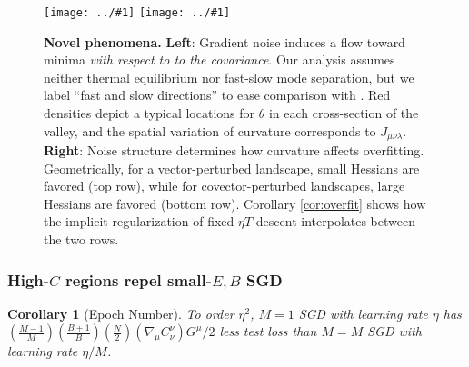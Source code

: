 \documentclass{article}
\theoremstyle{plain}
\newtheorem{cor}{Corollary}
\theoremstyle{definition}
\newcommand{\wrap}[1]{\left(#1\right)}
\newcommand{\plotmooh}[3]{\texttt{[image: ../\#1]}}
\begin{document}
            \begin{figure}[h!]
                \centering
                \plotmooh{diagrams/entropic-force-diagram}{}{0.32\columnwidth} 
                \plotmooh{diagrams/sharp}{}{0.31\columnwidth}
                \caption{
                    {\bf Novel phenomena.}
                    {\bf Left}:
                        Gradient noise induces a flow
                        toward minima \emph{with respect to to the
                        covariance}.  Our analysis assumes neither thermal
                        equilibrium nor fast-slow mode separation, but we label
                        ``fast and slow directions'' to ease comparison with
                        \cite{we19b}.  Red densities depict a typical locations
                        for $\theta$ in each cross-section of the valley,
                        and the spatial variation of curvature corresponds to
                        $J_{\mu\nu\lambda}$. 
                    {\bf Right}:
                        Noise structure determines how curvature affects
                        overfitting.  Geometrically, for a vector-perturbed
                        landscape, small Hessians are favored (top row), while
                        for covector-perturbed landscapes, large Hessians are
                        favored (bottom row).  Corollary \ref{cor:overfit}
                        shows how the implicit regularization of fixed-$\eta T$
                        descent interpolates between the two rows.
                }
                \label{fig:cubicandspring}
            \end{figure}
    
        \subsubsection{High-$C$ regions repel small-$E, B$ SGD}
            \label{subsect:epochs-batch}
    
            \begin{cor}[Epoch Number] \label{cor:epochs}
                To order $\eta^2$, $M=1$ SGD with learning rate $\eta$ has 
                $
                     \wrap{\frac{M-1}{M}}\wrap{\frac{B+1}{B}}\wrap{\frac{N}{2}}
                     \wrap{\nabla_\mu C^{\nu}_{\nu}} G^\mu / 2
                $
                less test loss than $M=M$ SGD with learning rate $\eta/M$.
            \end{cor}
        
\end{document}
